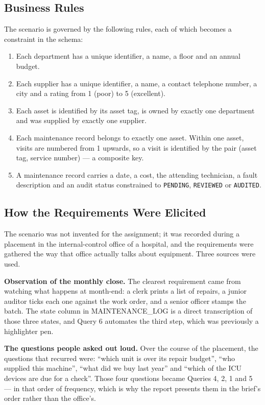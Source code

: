 \documentclass[conference]{IEEEtran}
\begin{document}
\subsection{Business Rules}
The scenario is governed by the following rules, each of which becomes a
constraint in the schema:
\begin{enumerate}
  \item Each department has a unique identifier, a name, a floor and an
        annual budget.
  \item Each supplier has a unique identifier, a name, a contact telephone
        number, a city and a rating from 1 (poor) to 5 (excellent).
  \item Each asset is identified by its asset tag, is owned by exactly one
        department and was supplied by exactly one supplier.
  \item Each maintenance record belongs to exactly one asset. Within one
        asset, visits are numbered from 1 upwards, so a visit is identified
        by the pair (asset tag, service number) --- a composite key.
  \item A maintenance record carries a date, a cost, the attending
        technician, a fault description and an audit status constrained to
        \texttt{PENDING}, \texttt{REVIEWED} or \texttt{AUDITED}.
\end{enumerate}

\subsection{How the Requirements Were Elicited}
The scenario was not invented for the assignment; it was recorded during a
placement in the internal-control office of a hospital, and the requirements
were gathered the way that office actually talks about equipment. Three
sources were used.

\textbf{Observation of the monthly close.} The clearest requirement came from
watching what happens at month-end: a clerk prints a list of repairs, a junior
auditor ticks each one against the work order, and a senior officer stamps the
batch. The state column in MAINTENANCE\_LOG is a direct transcription of those
three states, and Query 6 automates the third step, which was previously a
highlighter pen.

\textbf{The questions people asked out loud.} Over the course of the placement, the questions
that recurred were: ``which unit is over its repair budget'', ``who supplied
this machine'', ``what did we buy last year'' and ``which of the ICU devices
are due for a check''. Those four questions became Queries 4, 2, 1 and 5 --- in
that order of frequency, which is why the report presents them in the brief's
order rather than the office's.
\end{document}
